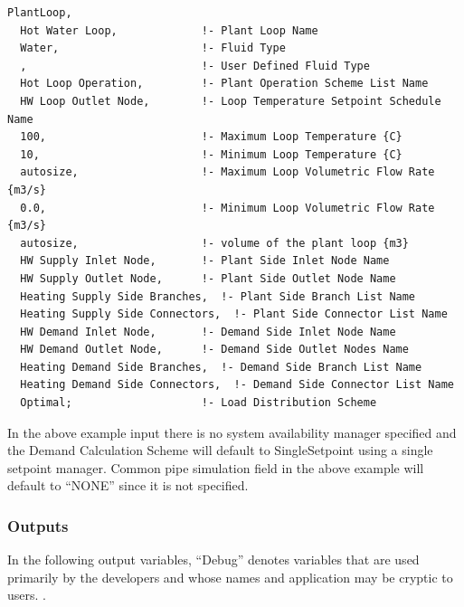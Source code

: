 \begin{lstlisting}
PlantLoop,
  Hot Water Loop,             !- Plant Loop Name
  Water,                      !- Fluid Type
  ,                           !- User Defined Fluid Type
  Hot Loop Operation,         !- Plant Operation Scheme List Name
  HW Loop Outlet Node,        !- Loop Temperature Setpoint Schedule Name
  100,                        !- Maximum Loop Temperature {C}
  10,                         !- Minimum Loop Temperature {C}
  autosize,                   !- Maximum Loop Volumetric Flow Rate {m3/s}
  0.0,                        !- Minimum Loop Volumetric Flow Rate {m3/s}
  autosize,                   !- volume of the plant loop {m3}
  HW Supply Inlet Node,       !- Plant Side Inlet Node Name
  HW Supply Outlet Node,      !- Plant Side Outlet Node Name
  Heating Supply Side Branches,  !- Plant Side Branch List Name
  Heating Supply Side Connectors,  !- Plant Side Connector List Name
  HW Demand Inlet Node,       !- Demand Side Inlet Node Name
  HW Demand Outlet Node,      !- Demand Side Outlet Nodes Name
  Heating Demand Side Branches,  !- Demand Side Branch List Name
  Heating Demand Side Connectors,  !- Demand Side Connector List Name
  Optimal;                    !- Load Distribution Scheme
\end{lstlisting}

In the above example input there is no system availability manager specified and the Demand Calculation Scheme will default to SingleSetpoint using a single setpoint manager. Common pipe simulation field in the above example will default to ``NONE'' since it is not specified.

\subsubsection{Outputs}\label{outputs-024}

In the following output variables, ``Debug'' denotes variables that are used primarily by the developers and whose names and application may be cryptic to users. .

